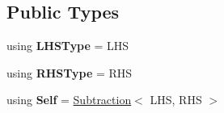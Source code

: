 \subsection*{Public Types}
\begin{DoxyCompactItemize}
\item 
\hypertarget{classlatex_1_1math_1_1Subtraction_a5d8b7f9b0573d7063f1b117f2eea4da6}{using {\bfseries L\-H\-S\-Type} = L\-H\-S}\label{classlatex_1_1math_1_1Subtraction_a5d8b7f9b0573d7063f1b117f2eea4da6}

\item 
\hypertarget{classlatex_1_1math_1_1Subtraction_a41805a0e9b8af712e04330fafc0f06b8}{using {\bfseries R\-H\-S\-Type} = R\-H\-S}\label{classlatex_1_1math_1_1Subtraction_a41805a0e9b8af712e04330fafc0f06b8}

\item 
\hypertarget{classlatex_1_1math_1_1Subtraction_a63cdfe10b155598b1adf4358268cbc6d}{using {\bfseries Self} = \hyperlink{classlatex_1_1math_1_1Subtraction}{Subtraction}$<$ L\-H\-S, R\-H\-S $>$}\label{classlatex_1_1math_1_1Subtraction_a63cdfe10b155598b1adf4358268cbc6d}

\end{DoxyCompactItemize}
